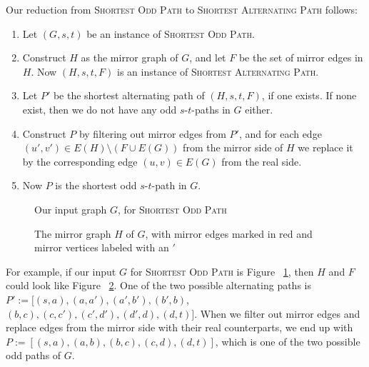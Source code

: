 Our reduction from \textsc{Shortest Odd Path} to \textsc{Shortest Alternating Path} follows:
\begin{enumerate}
    \item Let $(G, s, t)$ be an instance of \textsc{Shortest Odd Path}.
    \item Construct $H$ as the mirror graph of $G$, and let $F$ be the set of mirror edges in $H$. Now $(H, s, t, F)$ is an instance of \textsc{Shortest Alternating Path}.
    \item Let $P'$ be the shortest alternating path of $(H, s, t, F)$, if one exists. If none exist, then we do not have any odd $s$-$t$-paths in $G$ either.
    \item Construct $P$ by filtering out mirror edges from $P'$, and for each edge $(u',v') \in E(H) \setminus (F \cup E(G))$ from the mirror side of $H$ we replace it by the corresponding edge $(u,v) \in E(G)$ from the real side.
    \label{point:translate_alternating_path}
    \item Now $P$ is the shortest odd $s$-$t$-path in $G$.
\end{enumerate}

\begin{figure}
    \centering
    
    \caption{Our input graph $G$, for \textsc{Shortest Odd Path}}
    \label{figure:small5}
\end{figure}

\begin{figure}
    \centering
    
    \caption{The mirror graph $H$ of $G$, with mirror edges marked in red and mirror vertices labeled with an $'$}
    \label{figure:small5-2}
\end{figure}

For example, if our input $G$ for \textsc{Shortest Odd Path} is Figure ~\ref{figure:small5}, then $H$ and $F$ could look like Figure ~\ref{figure:small5-2}. One of the two possible alternating paths is $P' := [(s,a), (a, a'), (a',b'), (b',b)$, $(b,c), (c,c'), (c',d'), (d',d), (d,t)]$. When we filter out mirror edges and replace edges from the mirror side with their real counterparts, we end up with $P := [(s,a),(a,b),(b,c),(c,d),(d,t)]$, which is one of the two possible odd paths of $G$. 

